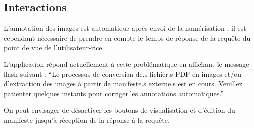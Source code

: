 	\subsection{Interactions}
	L’annotation des images est automatique après envoi de la numérisation ; il est cependant nécessaire de prendre en compte le temps de réponse de la requête du point de vue de l’utilisateur-rice.
	 
	L’application \eida répond actuellement à cette problématique en affichant le message flash suivant : “Le processus de conversion de.s fichier.s PDF en images et/ou d'extraction des images à partir de manifeste.s externe.s est en cours. Veuillez patienter quelques instants pour corriger les annotations automatiques.”
	
	On peut envisager de désactiver les boutons de visualisation et d’édition du manifeste jusqu’à réception de la réponse à la requête.
